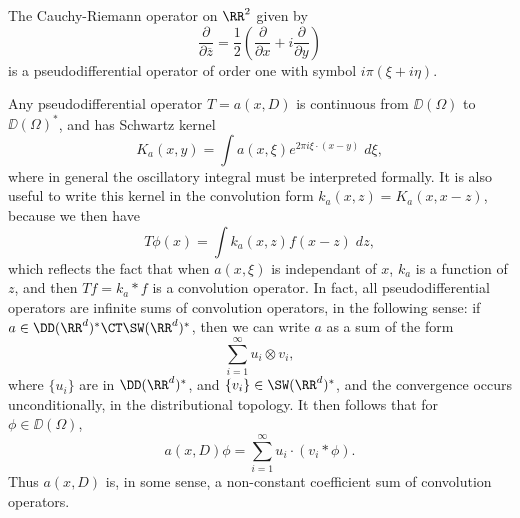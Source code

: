 \begin{example}
    The Cauchy-Riemann operator on $\RR^2$ given by
    \[ \frac{\partial}{\partial \overline{z}} = \frac{1}{2} \left( \frac{\partial}{\partial x} + i \frac{\partial}{\partial y} \right) \]
    is a pseudodifferential operator of order one with symbol $i \pi(\xi + i \eta)$.
\end{example}

Any pseudodifferential operator $T = a(x,D)$ is continuous from $\DD(\Omega)$ to $\DD(\Omega)^*$, and has Schwartz kernel
%
\[ K_a(x,y) = \int a(x,\xi) e^{2 \pi i \xi \cdot (x - y)}\; d\xi, \]
%
where in general the oscillatory integral must be interpreted formally. It is also useful to write this kernel in the convolution form $k_a(x,z) = K_a(x,x-z)$, because we then have
%
\[ T\phi(x) = \int k_a(x,z) f(x-z)\; dz, \]
%
which reflects the fact that when $a(x,\xi)$ is independant of $x$, $k_a$ is a function of $z$, and then $Tf = k_a * f$ is a convolution operator. In fact, all pseudodifferential operators are infinite sums of convolution operators, in the following sense: if $a \in \DD(\RR^d)^* \CT \SW(\RR^d)^*$, then we can write $a$ as a sum of the form
%
\[ \sum_{i = 1}^\infty u_i \otimes v_i, \]
%
where $\{ u_i \}$ are in $\DD(\RR^d)^*$, and $\{ v_i \} \in \SW(\RR^d)^*$, and the convergence occurs unconditionally, in the distributional topology. It then follows that for $\phi \in \DD(\Omega)$,
%
\[ a(x,D) \phi = \sum_{i = 1}^\infty u_i \cdot (v_i * \phi). \]
%
Thus $a(x,D)$ is, in some sense, a non-constant coefficient sum of convolution operators.

